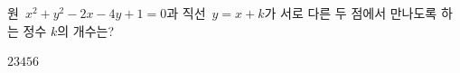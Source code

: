 원~$x^2+y^2-2x-4y+1=0$과 직선~$y=x+k$가 서로 다른 두 점에서 만나도록 하는 정수 $k$의 개수는?
\begin{choices32}{$2$}{$3$}{$4$}{$5$}{$6$}\end{choices32}
